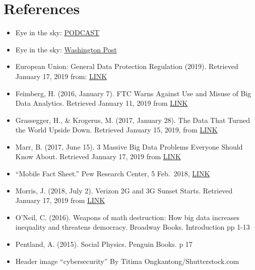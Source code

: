 \documentclass[]{book}
\begin{document}
\hypertarget{references-3}{%
\section{References}\label{references-3}}

\begin{itemize}
\item
  Eye in the sky: \href{https://www.wnycstudios.org/story/eye-sky}{PODCAST}
\item
  Eye in the sky: \href{https://www.washingtonpost.com/business/technology/new-surveillance-technology-can-track-everyone-in-an-area-for-several-hours-at-a-time/2014/02/05/82f1556e-876f-11e3-a5bd-844629433ba3_story.html?utm_term=.3be05b5b0d1d}{Washington Post}
\item
  European Union: General Data Protection Regulation (2019). Retrieved January 17, 2019 from: \href{https://eugdpr.org/the-regulation/}{LINK}
\item
  Feimberg, H. (2016, January 7). FTC Warns Against Use and Misuse of Big Data Analytics. Retrieved January 11, 2019 from \href{https://www.insightsassociation.org/article/ftc-warns-against-use-and-misuse-big-data-analytics}{LINK}
\item
  Grassegger, H., \& Krogerus, M. (2017, January 28). The Data That Turned the World Upside Down. Retrieved January 15, 2019, from \href{https://publicpolicy.stanford.edu/news/data-turned-world-upside-down}{LINK}
\item
  Marr, B. (2017, June 15). 3 Massive Big Data Problems Everyone Should Know About. Retrieved January 17, 2019 from \href{https://www.forbes.com/sites/bernardmarr/2017/06/15/3-massive-big-data-problems-everyone-should-know-about/\#4eeeb8a96186}{LINK}
\item
  ``Mobile Fact Sheet.'' Pew Research Center, 5 Feb.~2018, \href{www.pewinternet.org/fact-sheet/mobile/}{LINK}
\item
  Morris, J. (2018, July 2). Verizon 2G and 3G Sunset Starts. Retrieved January 17, 2019 from \href{https://www.digi.com/blog/verizon-2g-and-3g-sunset-starts/}{LINK}
\item
  O'Neil, C. (2016). Weapons of math destruction: How big data increases inequality and threatens democracy. Broadway Books. Introduction pp 1-13
\item
  Pentland, A. (2015). Social Physics. Penguin Books. p 17
\item
  Header image ``cybersecurity'' By Titima Ongkantong/Shutterstock.com
\end{itemize}
\end{document}
